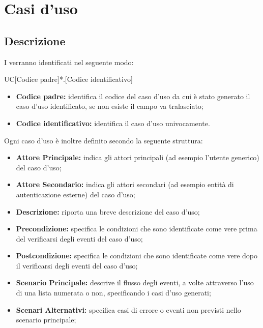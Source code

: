 \documentclass[../AnalisideiRequisiti.tex]{subfiles}
\begin{document}

	\chapter{Casi d'uso}
	\section{Descrizione}
	I  verranno identificati nel seguente modo: 
	
	\begin{center}
		UC[Codice padre]*.[Codice identificativo]
	\end{center}
	
	\begin{itemize}
		\item \textbf{Codice padre:} identifica il codice del caso d'uso da cui è stato generato il caso d'uso identificato, se non esiste il campo va tralasciato;
		\item \textbf{Codice identificativo:} identifica il caso d'uso univocamente.
	\end{itemize}
	
	\noindent Ogni caso d'uso è inoltre definito secondo la seguente struttura:
	\begin{itemize}
		\item \textbf{Attore Principale:} indica gli attori principali (ad esempio l'utente generico) del caso d'uso;
		\item \textbf{Attore Secondario:} indica gli attori secondari (ad esempio entità di autenticazione esterne) del caso d'uso;
		\item \textbf{Descrizione:} riporta una breve descrizione del caso d'uso;
		\item \textbf{Precondizione:} specifica le condizioni che sono identificate come vere prima del verificarsi degli eventi del caso d'uso;
		\item \textbf{Postcondizione:} specifica le condizioni che sono identificate come vere dopo il verificarsi degli eventi del caso d'uso;
		\item \textbf{Scenario Principale:} descrive il flusso degli eventi, a volte attraverso l'uso di una lista numerata o non, specificando i casi d'uso generati;
		\item \textbf{Scenari Alternativi:} specifica casi di errore o eventi non previsti nello scenario principale;
		
	\end{itemize}
\end{document}
